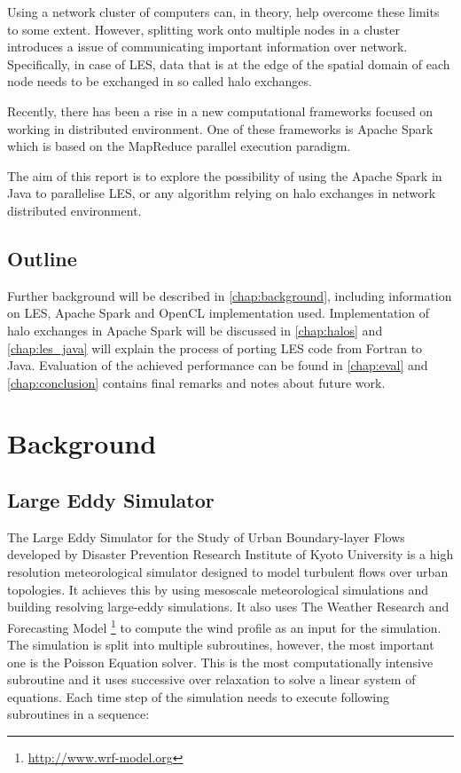 \documentclass{l4proj}
\begin{document}
Using a network cluster of computers can, in theory, help overcome these limits to some extent.
However, splitting work onto multiple nodes in a cluster introduces a issue of communicating
important information over network. Specifically, in case of LES, data that is at the edge of
the spatial domain of each node needs to be exchanged in so called halo exchanges.

Recently, there has been a rise in a new computational frameworks focused on working in
distributed environment. One of these frameworks is Apache Spark which is based on
the MapReduce parallel execution paradigm.

The aim of this report is to explore the possibility of using the Apache Spark in Java to parallelise
LES, or any algorithm relying on halo exchanges in network distributed environment.

\section{Outline}

Further background will be described in \autoref{chap:background}, including information
on LES, Apache Spark and OpenCL implementation used. Implementation of halo exchanges in 
Apache Spark will be discussed in \autoref{chap:halos} and \autoref{chap:les_java} will
explain the process of porting LES code from Fortran to Java. Evaluation of the achieved
performance can be found in \autoref{chap:eval} and \autoref{chap:conclusion} contains
final remarks and notes about future work.

\chapter{Background}
\label{chap:background}

\section{Large Eddy Simulator}

The Large Eddy Simulator for the Study of Urban Boundary-layer Flows developed by
Disaster Prevention Research Institute of Kyoto University is a high resolution
meteorological simulator designed to model turbulent flows over urban topologies. 
It achieves this by using mesoscale meteorological simulations and building resolving
large-eddy simulations. It also uses The Weather Research and Forecasting Model \footnote{\url{http://www.wrf-model.org}}
to compute the wind profile as an input for the simulation. The simulation is split into
multiple subroutines, however, the most important one is the Poisson Equation solver.
This is the most computationally intensive subroutine and it uses successive over relaxation to solve
a linear system of equations. Each time step of the simulation needs to execute following subroutines
in a sequence:
\end{document}
